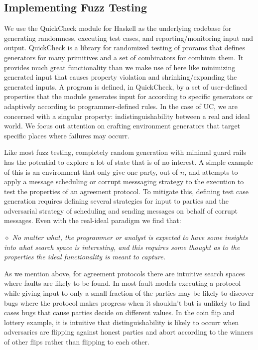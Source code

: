 \subsection{Implementing Fuzz Testing}
We use the QuickCheck module for Haskell as the underlying codebase for generating randomness, executing test cases, and reporting/monitoring input and output.
QuickCheck is a library for randomized testing of prorams that defines generators for many primitives and a set of combinators for combinin them.
It provides much great functionality than we make use of here like minimizing generated input that causes property violation and shrinking/expanding the generated inputs.
A program is defined, in QuickCheck, by a set of user-defined properties that the module generates input for according to specific generators or adaptively according to programmer-defined rules.
In the case of UC, we are concerned with a singular property: indistinguishability between a real and ideal world.
We focus out attention on crafting environment generators that target specific places where failures may occurr.

Like most fuzz testing, completely random generation with minimal guard rails has the potential to explore a lot of state that is of no interest.
A simple example of this is an environment that only give one party, out of $n$, and attempts to apply a message scheduling or corrupt messsaging strategy to the execution to test the properties of an agreement protocol.
To mitigate this, defining test case generation requires defining several strategies for input to parties and the adversarial strategy of scheduling and sending messages on behalf of corrupt messages.
Even with the real-ideal paradigm we find that:
\begin{center}
\emph{$\diamond$ No matter what, the programmer or analyst is expected to have some insights into what search space is interesting, and this requires some thought as to the properties the ideal functionality is meant to capture.}
\end{center}
As we mention above, for agreement protocols there are intuitive search spaces where faults are likely to be found.
In most fault models executing a protocol while giving input to only a small fraction of the parties may be likely to discover bugs where the protocol makes progress when it shouldn't but is unlikely to find cases bugs that cause parties decide on different values.
In the coin flip and lottery example, it is intuitive that distinguishability is likely to occurr when adversaries are flipping against honest parties and abort according to the winners of other flips rather than flipping to each other.

